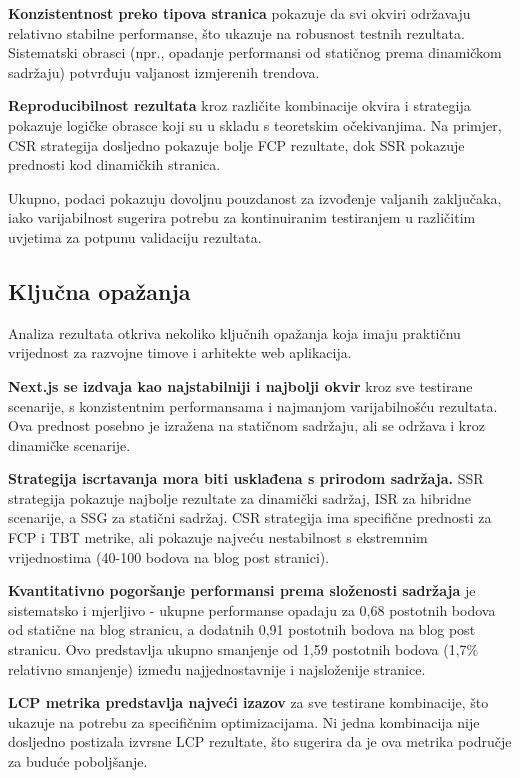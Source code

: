 \textbf{Konzistentnost preko tipova stranica} pokazuje da svi okviri održavaju relativno stabilne performanse, što ukazuje na robusnost testnih rezultata. Sistematski obrasci (npr., opadanje performansi od statičnog prema dinamičkom sadržaju) potvrđuju valjanost izmjerenih trendova.

\textbf{Reproducibilnost rezultata} kroz različite kombinacije okvira i strategija pokazuje logičke obrasce koji su u skladu s teoretskim očekivanjima. Na primjer, CSR strategija dosljedno pokazuje bolje FCP rezultate, dok SSR pokazuje prednosti kod dinamičkih stranica.

Ukupno, podaci pokazuju dovoljnu pouzdanost za izvođenje valjanih zaključaka, iako varijabilnost sugerira potrebu za kontinuiranim testiranjem u različitim uvjetima za potpunu validaciju rezultata.

\subsection{Ključna opažanja}

Analiza rezultata otkriva nekoliko ključnih opažanja koja imaju praktičnu vrijednost za razvojne timove i arhitekte web aplikacija.

\textbf{Next.js se izdvaja kao najstabilniji i najbolji okvir} kroz sve testirane scenarije, s konzistentnim performansama i najmanjom varijabilnošću rezultata. Ova prednost posebno je izražena na statičnom sadržaju, ali se održava i kroz dinamičke scenarije.

\textbf{Strategija iscrtavanja mora biti usklađena s prirodom sadržaja.} SSR strategija pokazuje najbolje rezultate za dinamički sadržaj, ISR za hibridne scenarije, a SSG za statični sadržaj. CSR strategija ima specifične prednosti za FCP i TBT metrike, ali pokazuje najveću nestabilnost s ekstremnim vrijednostima (40-100 bodova na blog post stranici).

\textbf{Kvantitativno pogoršanje performansi prema složenosti sadržaja} je sistematsko i mjerljivo - ukupne performanse opadaju za 0,68 postotnih bodova od statične na blog stranicu, a dodatnih 0,91 postotnih bodova na blog post stranicu. Ovo predstavlja ukupno smanjenje od 1,59 postotnih bodova (1,7\% relativno smanjenje) između najjednostavnije i najsloženije stranice.

\textbf{LCP metrika predstavlja najveći izazov} za sve testirane kombinacije, što ukazuje na potrebu za specifičnim optimizacijama. Ni jedna kombinacija nije dosljedno postizala izvrsne LCP rezultate, što sugerira da je ova metrika područje za buduće poboljšanje.

